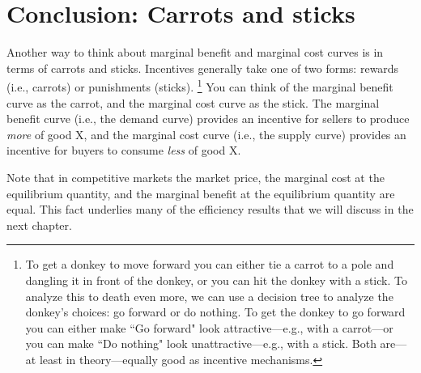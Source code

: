\begin{comment}
\subsection*{The whole enchilada}


Putting supply and demand together, we get Figure~\ref{fig:enchilada}. Total revenue (TR, a.k.a. total expenditure, TE)---is producer surplus (PS) plus total variable cost (TVC). Total benefit (TB) is the area under the demand curve (a.k.a. the marginal benefit\index{marginal!benefit|)} curve), so consumer surplus (CS) is $\mbox{CS}=\mbox{TB}-\mbox{TE}$. Total variable cost is the area under the supply curve (a.k.a. the marginal cost\index{marginal!cost} curve), so producer surplus is $\mbox{PS}=\mbox{TR}-\mbox{TVC}$. Together producer surplus and consumer surplus constitute the \textbf{gains from trade}.
\end{comment}




\section{Conclusion: Carrots and sticks}

Another way to think about marginal benefit and marginal cost curves is in terms of carrots and sticks. Incentives generally take one of two forms: rewards (i.e., carrots) or punishments (sticks). \footnote{To get a donkey to move forward you can either tie a carrot to a pole and dangling it in front of the donkey, or you can hit the donkey with a stick. To analyze this to death even more, we can use a decision tree to analyze the donkey's choices: go forward or do nothing. To get the donkey to go forward you can either make ``Go forward" look attractive---e.g., with a carrot---or you can make ``Do nothing" look unattractive---e.g., with a stick. Both are---at least in theory---equally good as incentive mechanisms.} You can think of the marginal benefit curve as the carrot, and the marginal cost curve as the stick. The marginal benefit curve (i.e., the demand curve) provides an incentive for sellers to produce \emph{more} of good X, and the marginal cost curve (i.e., the supply curve) provides an incentive for buyers to consume \emph{less} of good X.

Note that in competitive markets the market price, the marginal cost at the equilibrium quantity, and the marginal benefit at the equilibrium quantity are equal. This fact underlies many of the efficiency results that we will discuss in the next chapter.

